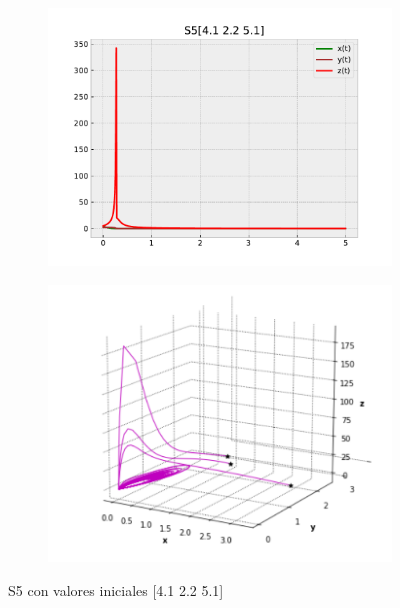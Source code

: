 \documentclass{wscpaperproc}
\theoremstyle{wsc}
\begin{document}
\begin{figure}[h]
	\centering
	\begin{subfigure}[b]{0.4\textwidth}
		\centering
		\includegraphics[width=\textwidth]{Simulations/S5[4.1 2.2 5.1].pdf}
		\label{fig:comparativa111}
	\end{subfigure}
	\begin{subfigure}[b]{0.4\textwidth}
		\centering
		\includegraphics[width=\textwidth]{GraficasPaper/Mistery3D2.png}
		\label{fig:comparativa112}
	\end{subfigure}
	\caption{S5 con valores iniciales [4.1 2.2 5.1]}

	\label{fig:comparacion15}
\end{figure}
\end{document}

